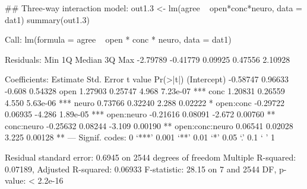 \begin{Schunk}
\begin{Sinput}
 ## Three-way interaction model:
 out1.3 <- lm(agree ~ open*conc*neuro, data = dat1)
 summary(out1.3)
\end{Sinput}
\begin{Soutput}
Call:
lm(formula = agree ~ open * conc * neuro, data = dat1)

Residuals:
     Min       1Q   Median       3Q      Max 
-2.79789 -0.41779  0.09925  0.47556  2.10928 

Coefficients:
                Estimate Std. Error t value Pr(>|t|)    
(Intercept)     -0.58747    0.96633  -0.608  0.54328    
open             1.27903    0.25747   4.968 7.23e-07 ***
conc             1.20831    0.26559   4.550 5.63e-06 ***
neuro            0.73766    0.32240   2.288  0.02222 *  
open:conc       -0.29722    0.06935  -4.286 1.89e-05 ***
open:neuro      -0.21616    0.08091  -2.672  0.00760 ** 
conc:neuro      -0.25632    0.08244  -3.109  0.00190 ** 
open:conc:neuro  0.06541    0.02028   3.225  0.00128 ** 
---
Signif. codes:  0 ‘***’ 0.001 ‘**’ 0.01 ‘*’ 0.05 ‘.’ 0.1 ‘ ’ 1

Residual standard error: 0.6945 on 2544 degrees of freedom
Multiple R-squared:  0.07189,	Adjusted R-squared:  0.06933 
F-statistic: 28.15 on 7 and 2544 DF,  p-value: < 2.2e-16
\end{Soutput}
\end{Schunk}
